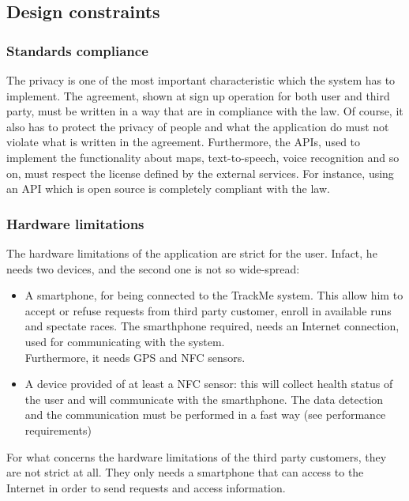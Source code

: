 \subsection{Design constraints}
\subsubsection{Standards compliance}
The privacy is one of the most important characteristic which the system has to implement. The agreement, shown at sign up operation for both user and third party, must be written in a way that are in compliance with the law. Of course, it also has to protect the privacy of people and what the application do must not violate what is written in the agreement. Furthermore, the APIs, used to implement the functionality about maps, text-to-speech, voice recognition and so on, must respect the license defined by the external services. For instance, using an API which is open source is completely compliant with the law. 

\subsubsection{Hardware limitations}
The hardware limitations of the application are strict for the user. Infact, he needs two devices, and the second one is not so wide-spread:
\begin{itemize}
\item A smartphone, for being connected to the TrackMe system. This allow him to accept or refuse requests from third party customer, enroll in available runs and spectate races. The smarthphone required, needs an Internet connection, used for communicating with the system. \\ 
Furthermore, it needs GPS and NFC sensors.  
\item A device provided of at least a NFC sensor: this will collect health status of the user and will communicate with the smarthphone. The data detection and the communication must be performed in a fast way (see performance requirements)
\end{itemize}

For what concerns the hardware limitations of the third party customers, they are not strict at all. They only needs a smartphone that can access to the Internet in order to send requests and access information.

